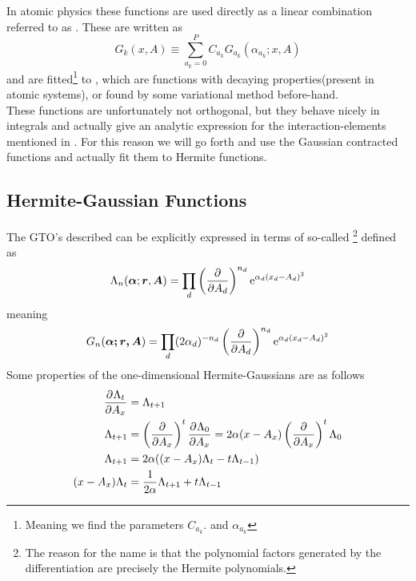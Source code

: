     In atomic physics these functions are used directly as a linear combination
    referred to as . These are written as
        \begin{equation}
            G_k(x, A) \equiv \sum\limits^P_{a_k=0} C_{a_k}
            G_{a_k}(\alpha_{a_k};x, A)
        \end{equation}
    and are fitted\footnote{Meaning we find the parameters $C_{a_k}.$ and
    $\alpha_{a_k}$} to , which are functions with
    decaying properties(present in atomic systems), or found by some variational
    method before-hand. \\

    These functions are unfortunately not orthogonal, but they behave nicely in
    integrals and actually give an analytic expression for the
    interaction-elements mentioned in . For this reason we
    will go forth and use the Gaussian contracted functions and actually fit
    them to Hermite functions.

\subsection{Hermite-Gaussian Functions}
    The GTO's described can be explicitly expressed in terms of so-called
    \footnote{The reason for the name is that
    the polynomial factors generated by the differentiation are precisely the
    Hermite polynomials.} defined as
        \begin{equation}
            \Lambda_n(\boldsymbol{{\alpha}};\boldsymbol{{r}},\boldsymbol{{A}}) = \prod_d
            \left(\frac{\mathrm{\partial}}{\mathrm{\partial} A_d}\right)^{n_d} \mathrm{e}^{\alpha_d(x_d-A_d)^2}
        \end{equation}
    meaning
        \begin{equation}
            G_n(\boldsymbol{{\alpha;\boldsymbol{{r}},\boldsymbol{{A}}}}) = \prod_d
            (2\alpha_d)^{-n_d}\left(\frac{\mathrm{\partial}}{\mathrm{\partial} A_d}\right)^{n_d} \mathrm{e}^{\alpha_d(x_d-A_d)^2}
        \end{equation}
    Some properties of the one-dimensional Hermite-Gaussians are as follows
        \begin{equation}
            \begin{aligned}
                \prd{A_x}[\Lambda_t] &= \Lambda_{t+1} \\
                \Lambda_{t+1} &= \prdp{A_x}{t}\prd{A_x}[\Lambda_0] =
                2\alpha(x-A_x)\prdp{A_x}{t}\Lambda_0 \\
                \Lambda_{t+1} &= 2\alpha((x-A_x)\Lambda_t - t\Lambda_{t-1}) \\
                (x-A_x)\Lambda_t &= \frac{1}{2\alpha}\Lambda_{t+1} + t\Lambda_{t-1}
            \end{aligned}
            \label{eq:hermiteGaussProp}
        \end{equation}

